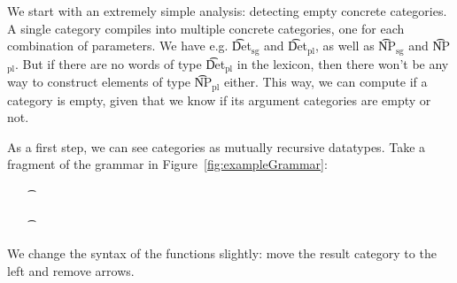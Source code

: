 We start with an extremely simple analysis: detecting empty concrete
categories. A single \gf{} category compiles into multiple concrete
categories, one for each combination of parameters. We have
e.g. \t{Det$_{\text{sg}}$} and \t{Det$_{\text{pl}}$}, as well as
\t{NP$_{\text{sg}}$} and \t{NP$_{\text{pl}}$}. But if there are no
words of type \t{Det$_{\text{pl}}$} in the lexicon, then there won't
be any way to construct elements of type \t{NP$_{\text{pl}}$}
either. This way, we can compute if a category is empty, given that we
know if its argument categories are empty or not.

As a first step, we can see \gf{} categories as mutually recursive
datatypes. Take a fragment of the \gf{} grammar in Figure~\ref{fig:exampleGrammar}:

\begin{itemize}
\item[\t{\OtherTok{cat}}]
\begin{HighlightingFancy}[]
 \NormalTok{; } \NormalTok{; } \NormalTok{; } \NormalTok{; } \NormalTok{;}
\end{HighlightingFancy}
\item[\t{\OtherTok{fun}}]\begin{HighlightingFancy}[]
 \FunctionTok{:}  \OtherTok{->}  \OtherTok{->}  \NormalTok{;}
  \FunctionTok{:}   \OtherTok{->}  \OtherTok{->}  \NormalTok{;}
  \FunctionTok{:}   \OtherTok{->}  \OtherTok{->}  \NormalTok{;}
\FunctionTok{:}  \NormalTok{;}
\FunctionTok{:}  \NormalTok{;}
\FunctionTok{:} 
\end{HighlightingFancy}
\end{itemize}

\noindent We change the syntax of the functions slightly: move the result
category to the left and remove arrows.

\begin{EmptyItem}
\begin{HighlightingFancy}[]
  \OtherTok{::=}   \NormalTok{;}
   \OtherTok{::=}   \FunctionTok{|} \FunctionTok{|} 
   \OtherTok{::=}   \NormalTok{;}
  \OtherTok{::=} \FunctionTok{|} \FunctionTok{|} 
 \OtherTok{::=} \FunctionTok{|} 
\end{HighlightingFancy}
\end{EmptyItem}


